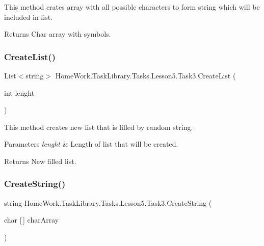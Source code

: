 This method crates array with all possible characters to form string which will be included in list. 

\begin{DoxyReturn}{Returns}
Char array with symbols.
\end{DoxyReturn}
\mbox{\label{class_home_work_1_1_task_library_1_1_tasks_1_1_lesson5_1_1_task3_af69ce2fd88d83f9b4f7caa588b5e2d5f}} 
\subsubsection{\texorpdfstring{CreateList()}{CreateList()}}
{\footnotesize\ttfamily List$<$string$>$ Home\+Work.\+Task\+Library.\+Tasks.\+Lesson5.\+Task3.\+Create\+List (\begin{DoxyParamCaption}\item[{int}]{lenght }\end{DoxyParamCaption})\hspace{0.3cm}{\ttfamily [private]}}



This method creates new list that is filled by random string. 


\begin{DoxyParams}{Parameters}
{\em lenght} & Length of list that will be created.\\
\hline
\end{DoxyParams}
\begin{DoxyReturn}{Returns}
New filled list.
\end{DoxyReturn}
\mbox{\label{class_home_work_1_1_task_library_1_1_tasks_1_1_lesson5_1_1_task3_a8df5e139d6adf386ca0bccc5eb87eb48}} 
\subsubsection{\texorpdfstring{CreateString()}{CreateString()}}
{\footnotesize\ttfamily string Home\+Work.\+Task\+Library.\+Tasks.\+Lesson5.\+Task3.\+Create\+String (\begin{DoxyParamCaption}\item[{char \mbox{[}$\,$\mbox{]}}]{char\+Array }\end{DoxyParamCaption})\hspace{0.3cm}{\ttfamily [private]}}



